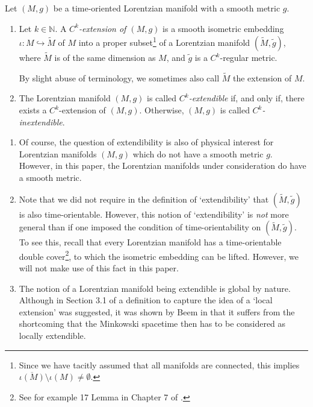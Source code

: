 \documentclass[reqno]{article}
\newcommand{\N}{\mathbb{N}}
\begin{document}
\begin{definition}
Let $(M,g)$ be a time-oriented Lorentzian manifold with a smooth metric $g$.
\begin{enumerate}
\item Let $k \in \N$. A \emph{$C^k$-extension of $(M,g)$} is a smooth isometric embedding $\iota : M \hookrightarrow \tilde{M}$ of $M$ into a proper subset\footnote{Since we have tacitly assumed that all manifolds are connected, this implies $\overline{\iota(M)} \setminus \iota(M) \neq \emptyset$.} of a Lorentzian manifold $(\tilde{M}, \tilde{g})$, where $\tilde{M}$ is of the same dimension as $M$, and $\tilde{g}$ is a $C^k$-regular metric. 

By slight abuse of terminology, we sometimes also call $\tilde{M}$ the extension of $M$.
\item The Lorentzian manifold $(M,g)$ is called \emph{$C^k$-extendible} if, and only if, there exists a $C^k$-extension of $(M,g)$. Otherwise, $(M,g)$ is called \emph{$C^k$-inextendible}.
\end{enumerate}
\end{definition}

\begin{remark}
\begin{enumerate}
\item Of course, the question of extendibility is also of physical interest for Lorentzian manifolds $(M,g)$ which do not have a smooth metric $g$. However, in this paper, the Lorentzian manifolds under consideration do have a smooth metric.

\item Note that we did not require in the definition of `extendibility' that $(\tilde{M},\tilde{g})$ is also time-orientable. However, this notion of `extendibility' is \emph{not} more general than if one imposed the condition of time-orientability on $(\tilde{M},\tilde{g})$. To see this, recall that every Lorentzian manifold has a time-orientable double cover\footnote{See for example 17 Lemma in Chapter 7 of \cite{ONeill}.}, to which the isometric embedding can be lifted. However, we will not make use of this fact in this paper.

\item The notion of a Lorentzian manifold being extendible is global by nature. Although in Section 3.1 of \cite{HawkEllis} a definition to capture the idea of a `local extension' was suggested, it was shown by Beem in \cite{Beem80} that it suffers from the shortcoming that the Minkowski spacetime then has to be considered as locally extendible. 
\end{enumerate}
\end{remark}
\end{document}
